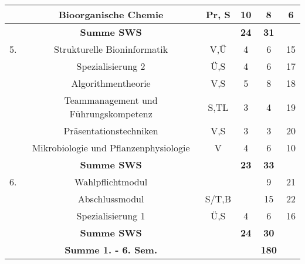 \begin{addmargin}[-5mm]{0cm}
\begin{center}
\begin{tabular}{|c|cc|c|c|c|}
        & Bioorganische Chemie & Pr, S & 10 & 8 & 6 \\
\hline  & \textbf{Summe SWS}&  & \textbf{24} & \textbf{31} &  \\
\hline 5. & Strukturelle Bioninformatik & V,Ü & 4 & 6 & 15 \\ 
          & Spezialisierung 2 & Ü,S & 4 & 6 & 17 \\ 
\hline  & Algorithmentheorie & V,S & 5 & 8 & 18 \\ 
\hline  & Teammanagement und Führungskompetenz & S,TL & 3 & 4 & 19 \\
\hline  & Präsentationstechniken & V,S & 3 & 3 & 20 \\
\hline  & Mikrobiologie und Pflanzenphysiologie & V & 4 & 6 & 10 \\
\hline  & \textbf{Summe SWS}&  & \textbf{23} & \textbf{33} &  \\
\hline 6. & Wahlpflichtmodul &  &  & 9 & 21 \\ 
\hline  & Abschlussmodul & S/T,B &  & 15 & 22 \\ 
\hline  & Spezialisierung 1 & Ü,S & 4 & 6 & 16 \\
\hline  & \textbf{Summe SWS} &  & \textbf{24} & \textbf{30} &  \\ 
\hline  & \textbf{Summe 1. - 6. Sem.} &  &  & \textbf{180} &  \\ 
\hline 
\end{tabular} 

\end{center}

\end{addmargin}

